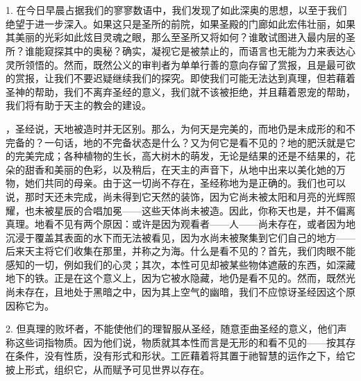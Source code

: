 

\section{}

\par

1. 在今日早晨占据我们的寥寥数语中，我们发现了如此深奥的思想，以至于我们绝望于进一步深入。如果这只是圣所的前院，如果圣殿的门廊如此宏伟壮丽，如果其美丽的光彩如此炫目灵魂之眼，那么至圣所又将如何？谁敢试图进入最内层的圣所？谁能窥探其中的奥秘？确实，凝视它是被禁止的，而语言也无能为力来表达心灵所领悟的。然而，既然公义的审判者为单单行善的意向存留了赏报，且是最可欲的赏报，让我们不要迟疑继续我们的探究。即使我们可能无法达到真理，但若藉着圣神的帮助，我们不离弃圣经的意义，我们就不该被拒绝，并且藉着恩宠的帮助，我们将有助于天主的教会的建设。\par

，圣经说，天地被造时并无区别。那么，为何天是完美的，而地仍是未成形的和不完备的？一句话，地的不完备状态是什么？又为何它是看不见的？地的肥沃就是它的完美完成；各种植物的生长，高大树木的萌发，无论是结果的还是不结果的，花朵的甜香和美丽的色彩，以及稍后，在天主的声音下，从地中出来以美化她的万物，她们共同的母亲。由于这一切尚不存在，圣经称地为是正确的。我们也可以说，那时天还未完成，尚未得到它天然的装饰，因为它尚未被太阳和月亮的光辉照耀，也未被星辰的合唱加冕——这些天体尚未被造。因此，你称天也是，并不偏离真理。地看不见有两个原因：或许是因为观看者——人——尚未存在，或者因为地沉浸于覆盖其表面的水下而无法被看见，因为水尚未被聚集到它们自己的地方——后来天主将它们收集在那里，并称之为海。什么是看不见的？首先，我们肉眼不能感知的一切，例如我们的心灵；其次，本性可见却被某些物体遮蔽的东西，如深藏地下的铁。正是在这个意义上，因为它被水隐藏，地仍是看不见的。然而，既然光尚未存在，且地处于黑暗之中，因为其上空气的幽暗，我们不应惊讶圣经因这个原因称它为。\par

2. 但真理的败坏者，不能使他们的理智服从圣经，随意歪曲圣经的意义，他们声称这些词指物质。因为他们说，物质就其本性而言是无形的和看不见的——按其存在条件，没有性质，没有形式和形状。工匠藉着将其置于祂智慧的运作之下，给它披上形式，组织它，从而赋予可见世界以存在。\par

